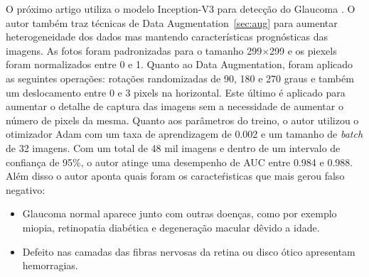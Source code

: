 \documentclass[ %
	msc, %
	portugues %
]{../ppgccufmg}
\begin{document}
    O próximo artigo utiliza o modelo Inception-V3 \citep{DBLP:journals/corr/SzegedyVISW15} para
    detecção do Glaucoma \citep{LI20181199}. O autor também traz técnicas de Data
    Augmentation~\ref{sec:aug} para aumentar heterogeneidade
    dos dados mas mantendo características prognósticas das imagens. As fotos foram padronizadas
    para o tamanho 299$\times$299 e os piexels foram normalizados
    entre 0 e 1. Quanto ao Data Augmentation, foram aplicado as seguintes operações: rotações
    randomizadas de 90, 180 e 270 graus e também um deslocamento entre 0 e 3 pixels na horizontal.
    Este último é aplicado para aumentar o detalhe de captura das imagens sem a necessidade de
    aumentar o número de pixels da mesma. Quanto aos parâmetros do treino, o autor utilizou o
    otimizador Adam \citep{adam} com um taxa de aprendizagem de 0.002 e um tamanho de \textit{batch}
    de 32 imagens. Com um total de 48 mil imagens e dentro de um intervalo de confiança de 95\%, o autor atinge uma desempenho de AUC
    entre 0.984 e 0.988. Além disso o autor aponta quais foram os caracteŕisticas que mais gerou
    falso negativo:
    \begin{itemize}
        \item Glaucoma normal aparece junto com outras doenças, como por exemplo miopia, retinopatia diabética e
            degeneração macular dêvido a idade.
        \item Defeito nas camadas das fibras nervosas da retina ou disco ótico apresentam hemorragias.
    \end{itemize}
\end{document}
